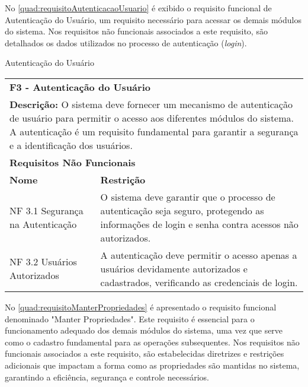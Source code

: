 \clearpage

No \autoref{quad:requisitoAutenticacaoUsuario} é exibido o requisito funcional de Autenticação do Usuário, um requisito necessário para acessar os demais módulos do sistema. Nos requisitos não funcionais associados a este requisito, são detalhados os dados utilizados no processo de autenticação (\textit{login}).

\begin{tabframed}[htb]
  \caption{Autenticação do Usuário}
  \label{quad:requisitoAutenticacaoUsuario}
  \renewcommand{\arraystretch}{1.5}
  \begin{tabular}{|l|l|}
    \cline{1-2}
    \multicolumn{2}{|l|}{\textbf{F3 - Autenticação do Usuário}}
    \\ \cline{1-2}

    \multicolumn{2}{|p{15cm}|}{
    \raggedright \textbf{Descrição:} O sistema deve fornecer um mecanismo de autenticação de usuário para permitir o acesso aos diferentes módulos do sistema. A autenticação é um requisito fundamental para garantir a segurança e a identificação dos usuários.
    }
    \\ \cline{1-2}

    \multicolumn{2}{|l|}{\textbf{Requisitos Não Funcionais}}
    \\ \cline{1-2}

    \textbf{Nome}                    &
    \textbf{Restrição}
    \\ \cline{1-2}

    NF 3.1 Segurança na Autenticação &
    \multicolumn{1}{|p{9cm}|}{\raggedright O sistema deve garantir que o processo de autenticação seja seguro, protegendo as informações de login e senha contra acessos não autorizados.}
    \\ \cline{1-2}

    NF 3.2 Usuários Autorizados      &
    \multicolumn{1}{|p{9cm}|}{\raggedright A autenticação deve permitir o acesso apenas a usuários devidamente autorizados e cadastrados, verificando as credenciais de login.}
    \\ \cline{1-2}
  \end{tabular}
  \fonte{} %
\end{tabframed}

\clearpage

No \autoref{quad:requisitoManterPropriedades} é apresentado o requisito funcional denominado "Manter Propriedades". Este requisito é essencial para o funcionamento adequado dos demais módulos do sistema, uma vez que serve como o cadastro fundamental para as operações subsequentes. Nos requisitos não funcionais associados a este requisito, são estabelecidas diretrizes e restrições adicionais que impactam a forma como as propriedades são mantidas no sistema, garantindo a eficiência, segurança e controle necessários.

